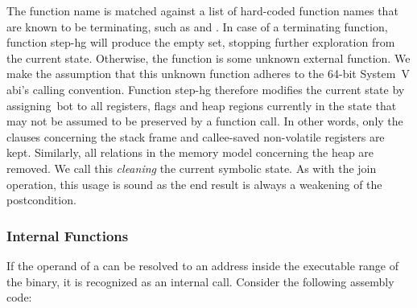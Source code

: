 The function name is matched against a list of hard-coded function names that are known to be terminating, such as  and .
In case of a terminating function, function \gls{step-hg} will produce the empty set, stopping further exploration from the current state.
Otherwise, the function is some unknown external function.
We make the assumption that this unknown function adheres to the 64-bit System~V \ac{abi}'s calling convention.
Function \gls{step-hg} therefore modifies the current state by assigning~\gls{bot} to all registers, flags and heap regions currently in the state that may not be assumed to be preserved by a function call.
In other words, only the clauses concerning the stack frame and callee-saved non-volatile registers are kept.
Similarly, all relations in the memory model concerning the heap are removed.
We call this \emph{cleaning} the current symbolic state.
As with the join operation, this usage is sound as the end result is always a weakening of the postcondition.

\subsubsection{Internal Functions}
If the operand of a  can be resolved to an address inside the executable range of the binary, it is recognized as an internal call.
Consider the following assembly code:

